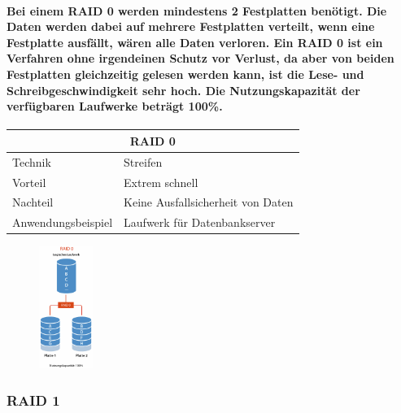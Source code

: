 \documentclass[a4paper]{article}
\begin{document}
    \paragraph{\color{codegreen}Bei einem RAID 0 werden mindestens 2 Festplatten benötigt. Die Daten werden dabei auf mehrere Festplatten verteilt, wenn eine Festplatte ausfällt, wären alle Daten verloren. Ein RAID 0 ist ein Verfahren ohne irgendeinen Schutz vor Verlust, da aber von beiden Festplatten gleichzeitig gelesen werden kann, ist die Lese- und Schreibgeschwindigkeit sehr hoch. Die Nutzungskapazität der verfügbaren Laufwerke beträgt 100\%.\\}
    \begin{vwcol}[widths={0.6,0.4}]
        \begin{tabular}{ll}
            \multicolumn{2}{c}{RAID 0}                                                  \\ \hline
            \multicolumn{1}{l|}{Technik}            & Streifen                          \\
            \multicolumn{1}{l|}{Vorteil}            & Extrem schnell                    \\
            \multicolumn{1}{l|}{Nachteil}           & Keine Ausfallsicherheit von Daten \\
            \multicolumn{1}{l|}{Anwendungsbeispiel} & Laufwerk für Datenbankserver
        \end{tabular}
        \begin{figure}[H]
            \includegraphics[height=4cm]{media/raid0}
            \label{fig:raid0}
        \end{figure}
    \end{vwcol}

    \subsubsection{\color{codegreen}RAID 1}
\end{document}
